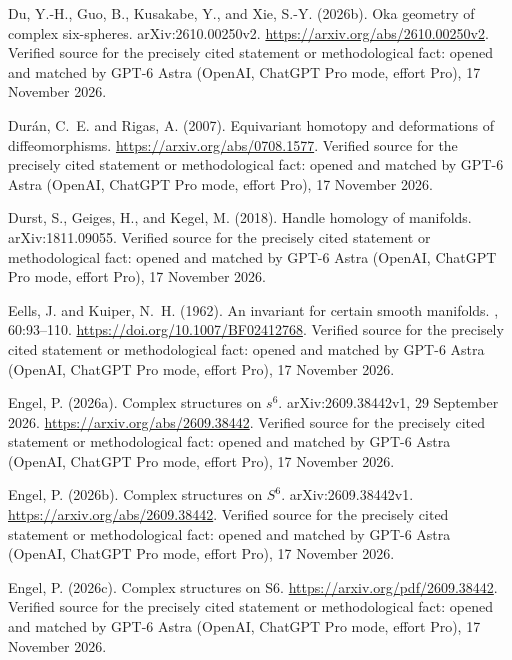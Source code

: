 \begin{thebibliography}{}
Du, Y.-H., Guo, B., Kusakabe, Y., and Xie, S.-Y. (2026b).
\newblock Oka geometry of complex six-spheres.
\newblock arXiv:2610.00250v2.
\newblock \url{https://arxiv.org/abs/2610.00250v2}. Verified source for the precisely cited statement or methodological fact: opened and matched by GPT-6 Astra (OpenAI, ChatGPT Pro mode, effort Pro), 17 November 2026.

Dur{\'a}n, C.~E. and Rigas, A. (2007).
\newblock Equivariant homotopy and deformations of diffeomorphisms.
\newblock \url{https://arxiv.org/abs/0708.1577}. Verified source for the precisely cited statement or methodological fact: opened and matched by GPT-6 Astra (OpenAI, ChatGPT Pro mode, effort Pro), 17 November 2026.

Durst, S., Geiges, H., and Kegel, M. (2018).
\newblock Handle homology of manifolds.
\newblock arXiv:1811.09055. Verified source for the precisely cited statement or methodological fact: opened and matched by GPT-6 Astra (OpenAI, ChatGPT Pro mode, effort Pro), 17 November 2026.

Eells, J. and Kuiper, N.~H. (1962).
\newblock An invariant for certain smooth manifolds.
, 60:93--110.
\newblock \url{https://doi.org/10.1007/BF02412768}. Verified source for the precisely cited statement or methodological fact: opened and matched by GPT-6 Astra (OpenAI, ChatGPT Pro mode, effort Pro), 17 November 2026.

Engel, P. (2026a).
\newblock Complex structures on $s^6$.
\newblock arXiv:2609.38442v1, 29 September 2026.
\newblock \url{https://arxiv.org/abs/2609.38442}. Verified source for the precisely cited statement or methodological fact: opened and matched by GPT-6 Astra (OpenAI, ChatGPT Pro mode, effort Pro), 17 November 2026.

Engel, P. (2026b).
\newblock Complex structures on {$S^6$}.
\newblock arXiv:2609.38442v1.
\newblock \url{https://arxiv.org/abs/2609.38442}. Verified source for the precisely cited statement or methodological fact: opened and matched by GPT-6 Astra (OpenAI, ChatGPT Pro mode, effort Pro), 17 November 2026.

Engel, P. (2026c).
\newblock Complex structures on {S6}.
\newblock \url{https://arxiv.org/pdf/2609.38442}. Verified source for the precisely cited statement or methodological fact: opened and matched by GPT-6 Astra (OpenAI, ChatGPT Pro mode, effort Pro), 17 November 2026.


\end{thebibliography}
